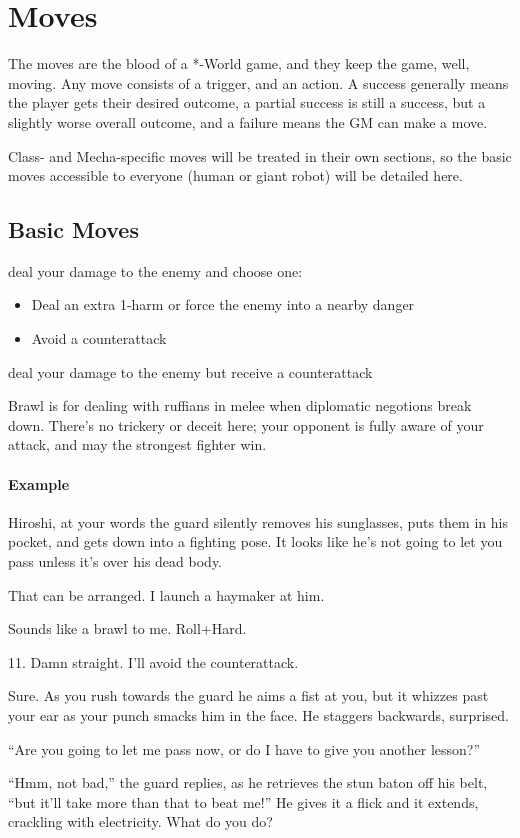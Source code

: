 \section{Moves}
The moves are the blood of a *-World game, and they keep the game,
well, moving. Any move consists of a trigger, and an action. A success
generally means the player gets their desired outcome, a partial
success is still a success, but a slightly worse overall outcome, and
a failure means the GM can make a move.

Class- and Mecha-specific moves will be treated in their own sections,
so the basic moves accessible to everyone (human or giant robot) will
be detailed here.

\subsection{Basic Moves}

{deal your damage to the enemy and choose one:
\begin{itemize}
\item Deal an extra 1-harm or force the enemy into a nearby danger
\item Avoid a counterattack
\end{itemize}}
{deal your damage to the enemy but receive a counterattack}

Brawl is for dealing with ruffians in melee when diplomatic negotions
break down. There's no trickery or deceit here; your opponent is fully
aware of your attack, and may the strongest fighter win.

\paragraph{Example}
\begin{dialogue}
   Hiroshi, at your words the guard silently removes his
  sunglasses, puts them in his pocket, and gets down into a fighting
  pose. It looks like he's not going to let you pass unless it's over
  his dead body.

   That can be arranged. I launch a haymaker at him.

   Sounds like a brawl to me. Roll+Hard.

   11. Damn straight. I'll avoid the counterattack.

   Sure. As you rush towards the guard he aims a fist at
  you, but it whizzes past your ear as your punch smacks him in the
  face. He staggers backwards, surprised.

   ``Are you going to let me pass now, or do I have to
  give you another lesson?''

   ``Hmm, not bad,'' the guard replies, as he retrieves the
  stun baton off his belt, ``but it'll take more than that to beat
  me!'' He gives it a flick and it extends, crackling with
  electricity. What do you do?
\end{dialogue}

